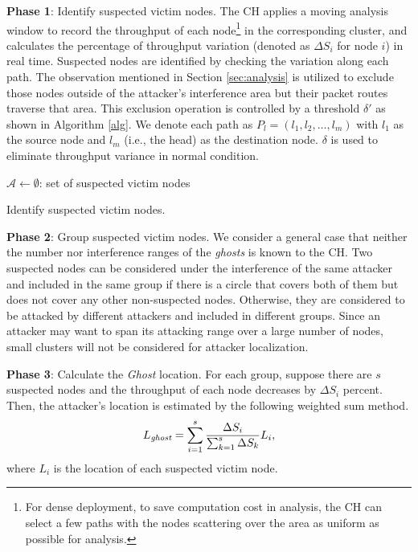 \documentclass[10pt,journal,cspaper,compsoc]{IEEEtran}
\begin{document}
{\bf Phase 1}: Identify suspected victim nodes. The CH applies a moving analysis window to record the throughput of each node\footnote{For dense deployment, to save computation cost in analysis, the CH can select a few paths with the nodes scattering over the area as uniform as possible for analysis.} in the corresponding cluster, and calculates the percentage of throughput variation (denoted as $\Delta S_i$ for node $i$) in real time. Suspected nodes are identified by checking the variation along each path. The observation mentioned in Section \ref{sec:analysis} is utilized to exclude those nodes outside of the attacker's interference area but their packet routes traverse that area. This exclusion operation is controlled by a threshold $\delta'$ as shown in Algorithm \ref{alg}. We denote each path as $P_l=(l_1,l_2,\ldots,l_m)$ with $l_1$ as the source node and $l_m$ (i.e., the head) as the destination node. $\delta$ is used to eliminate throughput variance in normal condition.
\begin{algorithm}[ht]
    $\mathcal{A} \leftarrow \emptyset$: set of suspected victim nodes\;
\caption{Identify suspected victim nodes.}\label{alg}
\end{algorithm}

{\bf Phase 2}: Group suspected victim nodes. We consider a general case that neither the number nor interference ranges of the {\em ghosts} is known to the CH. Two suspected nodes can be considered under the interference of the same attacker and included in the same group if there is a circle that covers both of them but does not cover any other non-suspected nodes. Otherwise, they are considered to be attacked by different attackers and included in different groups. Since an attacker may want to span its attacking range over a large number of nodes, small clusters will not be considered for attacker localization.

{\bf Phase 3}: Calculate the {\em Ghost} location. For each group, suppose there are $s$ suspected nodes and the throughput of each node decreases by $\Delta S_i$ percent. Then, the attacker's location is estimated by the following weighted sum method.
\begin{equation}
    L_{\textrm{\em ghost}} = \sum^{s}_{i=1}\frac{\Delta S_i}{\sum^s_{k=1}\Delta S_k}L_i,
\end{equation}
where $L_i$ is the location of each suspected victim node.
\end{document}
